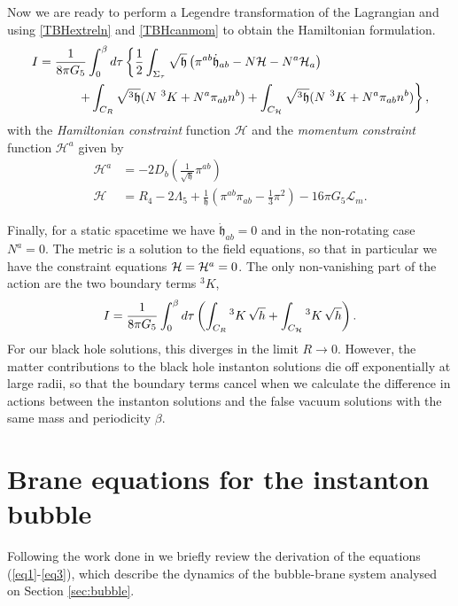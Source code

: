 \documentclass[aps,12pt,prd,superscriptaddress,preprintnumbers, 
	amssymb,
	amsmath,
	notitlepage,
	longbibliography,
	nofootinbib]{revtex4-1}
\newcommand{\be}{\begin{equation}}
\newcommand{\ee}{\end{equation}}
\newcommand{\beal}{\begin{aligned}}
\newcommand{\eeal}{\end{aligned}}
\begin{document}
Now we are ready to perform a Legendre transformation of the 
Lagrangian and using \eqref{TBHextreln} and
\eqref{TBHcanmom} to obtain the Hamiltonian formulation. 
\be
\beal
I = \frac{1}{8\pi G_5}\int_0^\beta d\tau \left\{ 
\frac12\int_{\Sigma_\tau} \sqrt{\mathfrak{h}} 
\left( \pi^{ab}\dot{\mathfrak{h}}_{ab} - N \mathcal{H} - N^a \mathcal{H}_a  \right)
\right. \hskip 3cm \\ 
\left. +  \int_{C_R} \sqrt{{}^3\mathfrak{h}} 
( N ~ ^3 K  + N^a \pi_{ab} n^b) 
+ \int_{C_{\cal H}} \sqrt{{}^3\mathfrak{h}} 
( N ~ ^3 K  + N^a \pi_{ab} n^b) \right\},
\eeal
\ee
with the \textit{Hamiltonian constraint} function $\mathcal{H}$ and 
the \textit{momentum constraint} function $\mathcal{H}^a$ given by
\be
\beal
\mathcal{H}^a &= -2 D_b \left(\frac{1}{\sqrt{\mathfrak{h}}} \pi^{ab} \right) \\
\mathcal{H} &=  R_4 - 2\Lambda_5 + \frac{1}{\mathfrak{h}} 
\left( \pi^{ab}\pi_{ab} - \frac{1}{3} \pi^2 \right)  - 16\pi G_5 \mathcal{L}_m.
\eeal
\label{TBHham}
\ee

Finally, for a static spacetime we have  $\dot{\mathfrak{h}}_{ab}=0$ 
and in the non-rotating case $N^a=0$. The metric is a solution
to the field equations, so that in particular we have the constraint 
equations ${\cal H}={\cal H}^a=0$.
The only non-vanishing part of the action are the two boundary terms $^3K$,
\be
I = \frac{1}{8\pi G_5} \int_0^\beta d\tau 
\left( \int_{C_R}  {}^3 K\, \sqrt{h} + \int_{C_{\cal H}}  {}^3 K\, \sqrt{h} \right).
\ee
For our black hole solutions, this diverges in the limit $R\to 0$. 
However, the matter contributions to the black hole instanton solutions 
die off exponentially at large radii, so that the boundary terms cancel when 
we calculate the difference in actions between the instanton solutions and 
the false vacuum solutions with the same mass and periodicity $\beta$.

\section{Brane equations for the instanton bubble}
\label{app:braneq}

Following the work done in \cite{Shiromizu:1999wj, Dadhich:2000am} 
we briefly review the derivation of the equations (\ref{eq1}-\ref{eq3}), 
which describe the dynamics of the bubble-brane system 
analysed on Section \ref{sec:bubble}.
\end{document}
